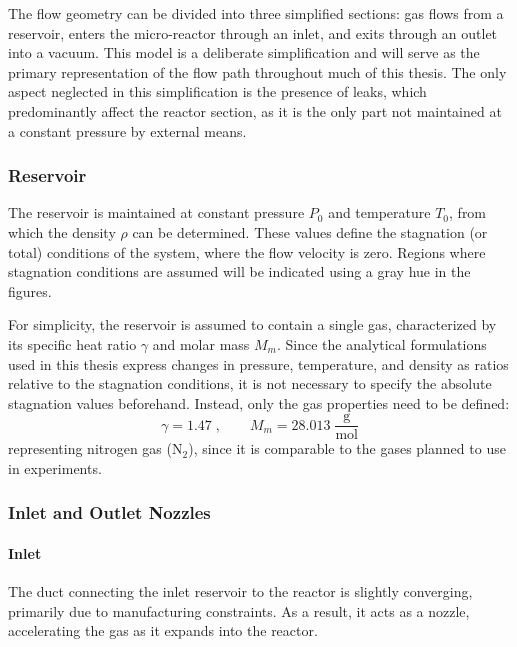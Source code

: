 
The flow geometry can be divided into three simplified sections: gas flows from a reservoir, enters the micro-reactor through an inlet, and exits through an outlet into a vacuum.
This model is a deliberate simplification and will serve as the primary representation of the flow path throughout much of this thesis.
The only aspect neglected in this simplification is the presence of leaks, which predominantly affect the reactor section, as it is the only part not maintained at a constant pressure by external means.

\subsubsection*{Reservoir}
	The reservoir is maintained at constant pressure $P_0$ and temperature $T_0$, from which the density $\rho$ can be determined.
	These values define the stagnation (or total) conditions of the system, where the flow velocity is zero.
	Regions where stagnation conditions are assumed will be indicated using a gray hue in the figures.

	For simplicity, the reservoir is assumed to contain a single gas, characterized by its specific heat ratio $\gamma$ and molar mass $M_m$.
	Since the analytical formulations used in this thesis express changes in pressure, temperature, and density as ratios relative to the stagnation conditions, it is not necessary to specify the absolute stagnation values beforehand.
	Instead, only the gas properties need to be defined:
	$$
		\gamma = 1.47\;, \qquad M_m = 28.013\; \frac{\text{g}}{\text{mol}}
	$$
	representing nitrogen gas ($\text{N}_2$), since it is comparable to the gases planned to use in experiments.
	\newpage

\subsubsection*{Inlet and Outlet Nozzles}

	\paragraph{Inlet}
	The duct connecting the inlet reservoir to the reactor is slightly converging, primarily due to manufacturing constraints.
	As a result, it acts as a nozzle, accelerating the gas as it expands into the reactor.

